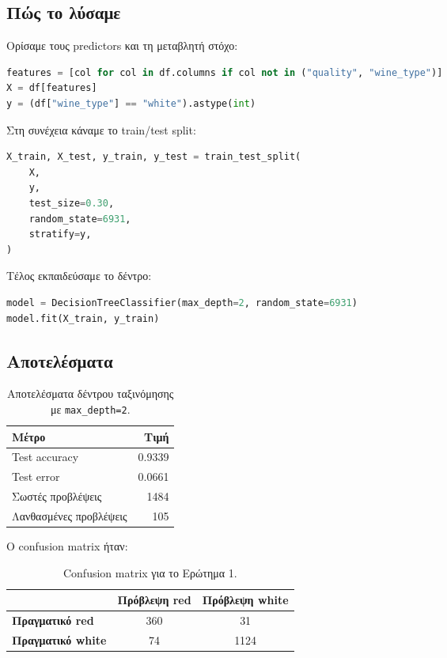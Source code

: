 \documentclass[12pt,a4paper]{article}
\newcommand{\code}[1]{\texttt{\textenglish{#1}}}
\begin{document}
\subsection{Πώς το λύσαμε}

Ορίσαμε τους predictors και τη μεταβλητή στόχο:

\begin{lstlisting}[language=Python]
features = [col for col in df.columns if col not in ("quality", "wine_type")]
X = df[features]
y = (df["wine_type"] == "white").astype(int)
\end{lstlisting}

Στη συνέχεια κάναμε το train/test split:

\begin{lstlisting}[language=Python]
X_train, X_test, y_train, y_test = train_test_split(
    X,
    y,
    test_size=0.30,
    random_state=6931,
    stratify=y,
)
\end{lstlisting}

Τέλος εκπαιδεύσαμε το δέντρο:

\begin{lstlisting}[language=Python]
model = DecisionTreeClassifier(max_depth=2, random_state=6931)
model.fit(X_train, y_train)
\end{lstlisting}

\subsection{Αποτελέσματα}

\begin{table}[H]
\centering
\caption{Αποτελέσματα δέντρου ταξινόμησης με \code{max\_depth=2}.}
\begin{tabular}{lr}
\toprule
\textbf{Μέτρο} & \textbf{Τιμή} \\
\midrule
Test accuracy & 0.9339 \\
Test error & 0.0661 \\
Σωστές προβλέψεις & 1484 \\
Λανθασμένες προβλέψεις & 105 \\
\bottomrule
\end{tabular}
\end{table}

Ο confusion matrix ήταν:

\begin{table}[H]
\centering
\caption{Confusion matrix για το Ερώτημα 1.}
\begin{tabular}{lcc}
\toprule
& \textbf{Πρόβλεψη red} & \textbf{Πρόβλεψη white} \\
\midrule
\textbf{Πραγματικό red} & 360 & 31 \\
\textbf{Πραγματικό white} & 74 & 1124 \\
\bottomrule
\end{tabular}
\end{table}
\end{document}

